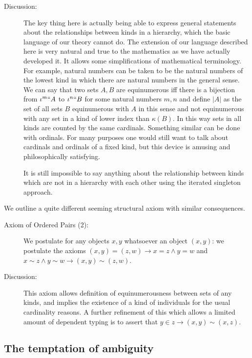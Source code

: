 \documentclass[12pt]{article}
\begin{document}
\begin{description}
\item[Discussion:]  The key thing here is actually being able to express general statements about the relationships between kinds in a hierarchy, which the basic language of our theory cannot do.  The extension of our language described here is very natural and true to the mathematics as we have actually developed it.  It allows
some simplifications of mathematical terminology.  For example, natural numbers can be taken to be the natural numbers of the lowest kind in which there are natural numbers in the general sense.  We can say that two sets $A,B$ are equinumerous iff there is a bijection from $\iota^m``A$ to $\iota^n``B$ for some natural numbers $m,n$
and define $|A|$ as the set of all sets $B$ equinumerous with $A$ in this sense and not equinumerous with any set in a kind of lower index than $\kappa(B)$.  In this way sets in all kinds are counted by the same cardinals.  Something similar can be done with ordinals.  For many purposes one would still want to talk about cardinals and ordinals of a fixed kind,
but this device is amusing and philosophically satisfying.

It is still impossible to say anything about the relationship between kinds which are not in a hierarchy with each other using the iterated singleton approach.

\end{description}

We outline a quite different seeming structural axiom with similar consequences.

\begin{description}

\item[Axiom of Ordered Pairs (2):]  We postulate for any objects $x,y$ whatsoever an object $(x,y)$:  we postulate the axioms $(x,y) = (z,w) \rightarrow x=z \wedge y=w$ and $x \sim z \wedge y\sim w \rightarrow (x,y) \sim (z,w)$.

\item[Discussion:]  This axiom allows definition of equinumerousness between sets of any kinds, and implies the existence of a kind of individuals for the usual cardinality reasons.  A further refinement of this which allows a limited amount of dependent typing is to assert that $y \in z \rightarrow (x,y) \sim (x,z)$.

\end{description}

\newpage

\subsection{The temptation of ambiguity}
\end{document}
